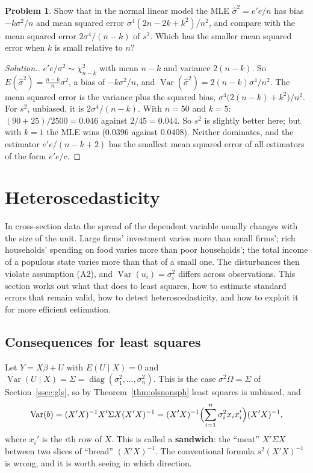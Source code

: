 \documentclass[11pt,a4paper]{article}
\numberwithin{equation}{section}
\DeclareMathOperator{\Var}{Var}
\theoremstyle{definition}
\newtheorem{problemx}{Problem}[subsection]
\newenvironment{problem}{\begin{problemx}}{\end{problemx}}
\newenvironment{solution}
  {\renewcommand{\qedsymbol}{}\begin{proof}[\textit{Solution}.]}
  {\end{proof}}
\begin{document}
\begin{problem}
Show that in the normal linear model the MLE $\hat\sigma^2 = e'e/n$ has bias $-k\sigma^2/n$ and mean squared error $\sigma^4(2n - 2k + k^2)/n^2$, and compare with the mean squared
error $2\sigma^4/(n - k)$ of $s^2$. Which has the smaller mean squared error when $k$ is small relative to $n$?
\end{problem}

\begin{solution}
$e'e/\sigma^2 \sim \chi^2_{n-k}$ with mean $n - k$ and variance $2(n - k)$. So $E(\hat\sigma^2) = \frac{n-k}{n}\sigma^2$, a bias of $-k\sigma^2/n$, and $\Var(\hat\sigma^2) = 2(n - k)\sigma^4/n^2$. The mean
squared error is the variance plus the squared bias, $\sigma^4\bigl(2(n - k) + k^2\bigr)/n^2$. For $s^2$, unbiased, it is $2\sigma^4/(n - k)$. With $n = 50$ and $k = 5$:
$(90 + 25)/2500 = 0.046$ against $2/45 = 0.044$. So $s^2$ is slightly better here; but with $k = 1$ the MLE wins ($0.0396$ against $0.0408$). Neither dominates, and
the estimator $e'e/(n - k + 2)$ has the smallest mean squared error of all estimators of the form $e'e/c$.
\end{solution}

\section{Heteroscedasticity}
\label{sec:hetero}

In cross-section data the spread of the dependent variable usually changes with the size of the unit. Large firms' investment varies more than
small firms'; rich households' spending on food varies more than poor households'; the total income of a populous state varies more than that of a
small one. The disturbances then violate assumption (A2), and $\Var(u_i) = \sigma_i^2$ differs across observations. This section works out what that
does to least squares, how to estimate standard errors that remain valid, how to detect heteroscedasticity, and how to exploit it for more
efficient estimation.

\subsection{Consequences for least squares}
\label{ssec:hetcons}

Let $Y = X\beta + U$ with $E(U \mid X) = 0$ and $\Var(U \mid X) = \Sigma = \operatorname{diag}(\sigma_1^2, \dots, \sigma_n^2)$. This is the case $\sigma^2\Omega = \Sigma$ of
Section~\ref{ssec:gls}, so by Theorem~\ref{thm:olsnonsph} least squares is unbiased, and
\begin{equation}
\label{eq:sandwich}
\Var(b) = (X'X)^{-1}X'\Sigma X(X'X)^{-1} = (X'X)^{-1}\Bigl(\sum_{i=1}^n\sigma_i^2x_ix_i'\Bigr)(X'X)^{-1},
\end{equation}
where $x_i'$ is the $i$th row of $X$. This is called a \textbf{sandwich}: the ``meat'' $X'\Sigma X$ between two slices of ``bread'' $(X'X)^{-1}$. The conventional
formula $s^2(X'X)^{-1}$ is wrong, and it is worth seeing in which direction.
\end{document}
